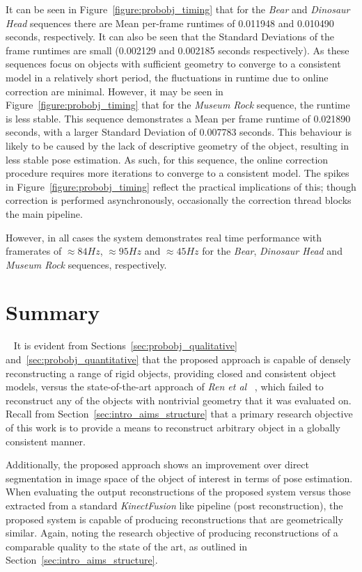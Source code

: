 It can be seen in Figure~\ref{figure:probobj_timing} that for the \textit{Bear} and 
\textit{Dinosaur Head} sequences there are Mean per-frame runtimes of 0.011948 and 
0.010490 seconds, respectively. It can also be seen that the Standard Deviations of the frame 
runtimes are small (0.002129 and 0.002185 seconds respectively). As these sequences focus on objects 
with sufficient geometry to converge to a consistent model in a relatively short period, the 
fluctuations in runtime due to online correction are minimal. However, it may be seen in 
Figure~\ref{figure:probobj_timing} that for the \textit{Museum Rock} sequence, the runtime is 
less stable. This sequence demonstrates a Mean per frame runtime of 0.021890 seconds, with 
a larger Standard Deviation of 0.007783 seconds. This behaviour is likely to be caused by the lack of 
descriptive geometry of the object, resulting in less stable pose estimation. As such, for this 
sequence, the online correction procedure requires more iterations to converge to a consistent 
model. The spikes in Figure~\ref{figure:probobj_timing} reflect the practical implications of 
this; though correction is performed asynchronously, occasionally the correction thread blocks the 
main pipeline.

However, in all cases the system demonstrates real time performance with framerates of 
\( \approx 84Hz \), \( \approx 95Hz \) and \( \approx 45Hz \) for the \textit{Bear}, 
\textit{Dinosaur Head} and \textit{Museum Rock} sequences, respectively.

\section{Summary}
~\label{sec:probobj_discussion}
It is evident from Sections~\ref{sec:probobj_qualitative} and~\ref{sec:probobj_quantitative} 
that the proposed approach is capable of densely reconstructing a range of rigid objects, providing 
closed and consistent object models, versus the state-of-the-art approach of \textit{Ren et al} 
~\cite{Ren2013}, which failed to reconstruct any of the objects with nontrivial geometry that it 
was evaluated on. Recall from Section~\ref{sec:intro_aims_structure} that a primary research objective 
of this work is to provide a means to reconstruct arbitrary object in a globally consistent manner.

Additionally, the proposed approach shows an improvement over direct segmentation 
in image space of the object of interest in terms of pose estimation. When evaluating the output 
reconstructions of the proposed system versus those extracted from a standard \textit{KinectFusion} 
like pipeline (post reconstruction), the proposed system is capable of producing reconstructions that 
are geometrically similar. Again, noting the research objective of producing reconstructions of a 
comparable quality to the state of the art, as outlined in Section~\ref{sec:intro_aims_structure}.


